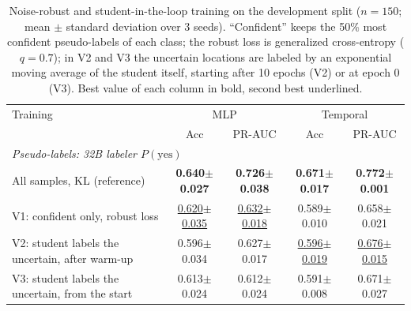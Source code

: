 \begin{table}[t]
\centering
\footnotesize
\setlength{\tabcolsep}{3pt}
\caption{Noise-robust and student-in-the-loop training on the development split ($n=150$; mean $\pm$ standard deviation over 3 seeds). ``Confident'' keeps the 50\% most confident pseudo-labels of each class; the robust loss is generalized cross-entropy ($q=0.7$); in V2 and V3 the uncertain locations are labeled by an exponential moving average of the student itself, starting after 10 epochs (V2) or at epoch 0 (V3). Best value of each column in bold, second best underlined.}
\label{tab:robust}
\begin{tabular}{lcccc}
\toprule
Training & \multicolumn{2}{c}{MLP} & \multicolumn{2}{c}{Temporal} \\
 & Acc & PR-AUC & Acc & PR-AUC \\
\midrule
\multicolumn{5}{l}{\emph{Pseudo-labels: 32B labeler $P(\mathrm{yes})$}} \\
All samples, KL (reference) & \textbf{0.640$\pm$0.027} & \textbf{0.726$\pm$0.038} & \textbf{0.671$\pm$0.017} & \textbf{0.772$\pm$0.001} \\
V1: confident only, robust loss & \underline{0.620$\pm$0.035} & \underline{0.632$\pm$0.018} & 0.589$\pm$0.010 & 0.658$\pm$0.021  \\
V2: student labels the uncertain, after warm-up & 0.596$\pm$0.034 & 0.627$\pm$0.017 & \underline{0.596$\pm$0.019} & \underline{0.676$\pm$0.015} \\
V3: student labels the uncertain, from the start & 0.613$\pm$0.024 & 0.612$\pm$0.024 & 0.591$\pm$0.008 & 0.671$\pm$0.027  \\
\bottomrule
\end{tabular}
\end{table}
